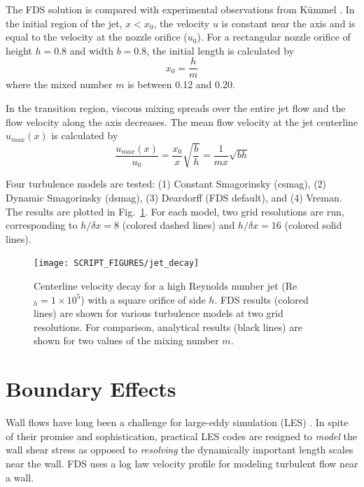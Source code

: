 \documentclass[11pt]{book}
\begin{document}
The FDS solution is compared with experimental observations from K\"ummel \cite{Kummel:2007}. In the initial region of the jet, $x<x_0$, the velocity $u$ is constant near the axis and is equal to the velocity at the nozzle orifice ($u_0$). For a rectangular nozzle orifice of height $h = 0.8$ and width $b = 0.8$, the initial length is calculated by
\begin{equation}
x_0 = \frac{h}{m}
\end{equation}
where the mixed number $m$ is between 0.12 and 0.20.

In the transition region, viscous mixing spreads over the entire jet flow and the flow velocity along the axis decreases. The mean flow velocity at the jet centerline $u_{max}(x)$ is calculated by
\begin{equation}
\frac{u_{max}(x)}{u_0} = \frac{x_0}{x}\sqrt{\frac{b}{h}} = \frac{1}{mx} \sqrt{bh}
\end{equation}

Four turbulence models are tested: (1) Constant Smagorinsky (csmag), (2) Dynamic Smagorinsky (dsmag), (3) Deardorff (FDS default), and (4) Vreman.  The results are plotted in Fig.~\ref{fig_jet_decay}. For each model, two grid resolutions are run, corresponding to $h/\delta x = 8$ (colored dashed lines) and $h/\delta x=16$ (colored solid lines).
\begin{figure}[h]
\centering
\texttt{[image: SCRIPT\_FIGURES/jet\_decay]}
\caption[Jet centerline velocity decay]{Centerline velocity decay for a high Reynolds number jet (Re$_h = 1 \times 10^5$) with a square orifice of side $h$.  FDS results (colored lines) are shown for various turbulence models at two grid resolutions.  For comparison, analytical results (black lines) are shown for two values of the mixing number $m$.}
\label{fig_jet_decay}
\end{figure}



\chapter{Boundary Effects}

Wall flows have long been a challenge for large-eddy simulation (LES) \cite{Baggett:1997,Baggett:1998,Cabot:1995,Pope:2000,Sagaut:2001}.  In spite of their promise and sophistication, practical LES codes are resigned to \emph{model} the wall shear stress as opposed to \emph{resolving} the dynamically important length scales near the wall. FDS uses a log law velocity profile \cite{Pope:2000} for modeling turbulent flow near a wall.
\end{document}
